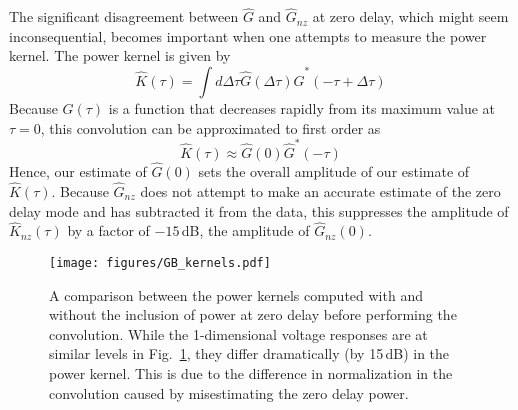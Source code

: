 \documentclass{article}
\begin{document}
 
 The significant disagreement between $\widehat{G}$ and $\widehat{G}_{nz}$ at zero delay, which might seem inconsequential, becomes important when one attempts to measure the power kernel. The power kernel is given by
 \begin{equation}
 \widehat{K}(\tau) = \int d \Delta \tau \widehat{G}(\Delta \tau) \widehat{G}^*(-\tau + \Delta \tau) 
 \end{equation}
Because $G(\tau)$ is a function that decreases rapidly from its maximum value at $\tau=0$, this convolution can be approximated to first order as
\begin{equation}
\widehat{K}(\tau) \approx \widehat{G}(0) \widehat{G}^*(-\tau)
\end{equation}
Hence, our estimate of $\widehat{G}(0)$ sets the overall amplitude of our estimate of $\widehat{K}(\tau)$. Because $\widehat{G}_{nz}$ does not attempt to make an accurate estimate of the zero delay mode and has subtracted it from the data, this suppresses the amplitude of $\widehat{K}_{nz}(\tau)$ by a factor of $-15$\,dB, the amplitude of $\widehat{G}_{nz}(0)$. 



\begin{figure}
\texttt{[image: figures/GB\_kernels.pdf]}
\caption{A comparison between the power kernels computed with and without the inclusion of power at zero delay before performing the convolution. While the 1-dimensional voltage responses are at similar levels in Fig.~\ref{fig:Reflectometry}, they differ dramatically (by 15\,dB) in the power kernel. This is due to the difference in normalization in the convolution caused by misestimating the zero delay power.}
\label{fig:Reflectometry}
\end{figure}
\end{document}
